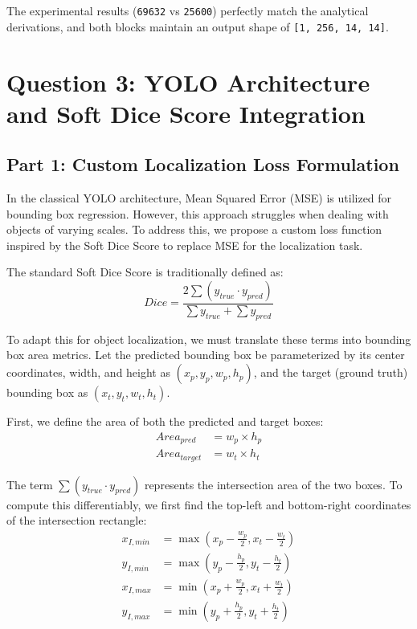 \documentclass{article}
\begin{document}
The experimental results (\texttt{69632} vs \texttt{25600}) perfectly match the analytical derivations, and both blocks maintain an output shape of \texttt{[1, 256, 14, 14]}.



\section{Question 3: YOLO Architecture and Soft Dice Score Integration}

\subsection{Part 1: Custom Localization Loss Formulation}

In the classical YOLO architecture, Mean Squared Error (MSE) is utilized for bounding box regression. However, this approach struggles when dealing with objects of varying scales. To address this, we propose a custom loss function inspired by the Soft Dice Score to replace MSE for the localization task.

The standard Soft Dice Score is traditionally defined as:
\begin{equation}
Dice = \frac{2\sum(y_{true} \cdot y_{pred})}{\sum y_{true} + \sum y_{pred}}
\end{equation}

To adapt this for object localization, we must translate these terms into bounding box area metrics. Let the predicted bounding box be parameterized by its center coordinates, width, and height as $(x_p, y_p, w_p, h_p)$, and the target (ground truth) bounding box as $(x_t, y_t, w_t, h_t)$. 

First, we define the area of both the predicted and target boxes:
\begin{align}
Area_{pred} &= w_p \times h_p \\
Area_{target} &= w_t \times h_t
\end{align}

The term $\sum(y_{true} \cdot y_{pred})$ represents the intersection area of the two boxes. To compute this differentiably, we first find the top-left and bottom-right coordinates of the intersection rectangle:
\begin{align}
x_{I, min} &= \max\left(x_p - \frac{w_p}{2}, x_t - \frac{w_t}{2}\right) \\
y_{I, min} &= \max\left(y_p - \frac{h_p}{2}, y_t - \frac{h_t}{2}\right) \\
x_{I, max} &= \min\left(x_p + \frac{w_p}{2}, x_t + \frac{w_t}{2}\right) \\
y_{I, max} &= \min\left(y_p + \frac{h_p}{2}, y_t + \frac{h_t}{2}\right)
\end{align}
\end{document}
